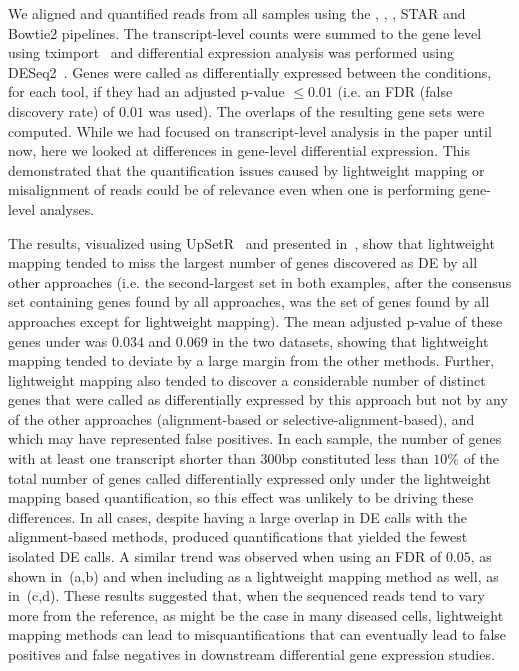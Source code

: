 We aligned and quantified reads from all samples using the \hsa, \saf, \qm, STAR and
Bowtie2 pipelines. The transcript-level counts were summed to the gene level
using tximport~\citep{soneson2015differential} and differential expression analysis was
performed using DESeq2~\citep{love2014moderated}. Genes were called as
differentially expressed between the conditions, for each tool, if they had an adjusted p-value
$\leq 0.01$ (i.e. an FDR (false discovery rate) of $0.01$ was used).  The overlaps of the
resulting gene sets were computed. While we had focused on transcript-level
analysis in the paper until now, here we looked at differences in gene-level
differential expression. This demonstrated that the quantification issues caused
by lightweight mapping or misalignment of reads could be of relevance even when
one is performing gene-level analyses.

The results, visualized using UpSetR~\citep{conway2017upsetr} and presented
  in~, show that lightweight mapping tended to miss the largest number 
  of genes discovered as DE by all other approaches (i.e. the second-largest set in 
  both examples, after the consensus set containing genes found by all approaches, was
  the set of genes found by all approaches except for lightweight mapping). The mean
  adjusted p-value of these genes under \qm was $0.034$ and $0.069$ in the two datasets,
  showing that lightweight mapping tended to deviate by a large margin from the other methods. Further,
  lightweight mapping also tended to discover a considerable number of distinct genes 
  that were called as differentially expressed by this approach but not by any of the other approaches
  (alignment-based or selective-alignment-based), and which may have represented false positives.
  In each sample, the number of genes with at least one transcript shorter than
  $300$bp constituted less than $10\%$ of the total number of genes called
  differentially expressed only under the lightweight mapping based
  quantification, so this effect was unlikely to be driving these differences.
  In all cases, despite having a large overlap
  in DE calls with the alignment-based methods, \hsa produced quantifications that yielded
  the fewest isolated DE calls. A similar trend was observed when using an FDR of $0.05$, as shown in~(a,b)
  and when including \kallisto as a lightweight mapping method as well, as in~(c,d). 
  These results suggested that, when
  the sequenced reads tend to vary more from the reference, as might be the case
  in many diseased cells, lightweight mapping methods can lead to
  misquantifications that can eventually lead to false positives and false
  negatives in downstream differential gene expression studies.
 
